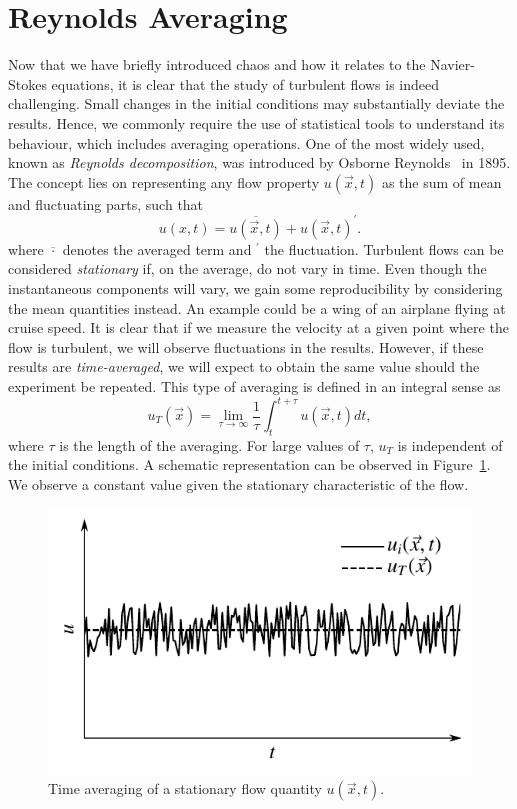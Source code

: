 \section{Reynolds Averaging}
Now that we have briefly introduced chaos and how it relates to the Navier-Stokes equations, it is clear that the study of turbulent flows is indeed challenging. Small changes in the initial conditions may substantially deviate the results. Hence, we commonly require the use of statistical tools to understand its behaviour, which includes averaging operations. One of the most widely used, known as \textit{Reynolds decomposition}, was introduced by Osborne Reynolds~\cite{} in 1895. The concept lies on representing any flow property $u(\vec{x},t)$ as the sum of mean and fluctuating parts, such that
\begin{equation}
	u(x,t) = \overline{u(\vec{x},t)} + u(\vec{x},t)^\prime.
	\label{eq:reynolds_decomp}
\end{equation}
where $\overline{\cdot}$ denotes the averaged term and $^\prime$ the fluctuation.
Turbulent flows can be considered \textit{stationary} if, on the average, do not vary in time. Even though the instantaneous components will vary, we gain some reproducibility by considering the mean quantities instead. An example could be a wing of an airplane flying at cruise speed. It is clear that if we measure the velocity at a given point where the flow is turbulent, we will observe fluctuations in the results. However, if these results are \textit{time-averaged}, we will expect to obtain the same value should the experiment be repeated. This type of averaging is defined in an integral sense as
\begin{equation}
	u_T(\vec{x}) = \lim_{\tau\rightarrow\infty} \frac{1}{\tau} \int_t^{t+\tau} u(\vec{x},t)dt,
	\label{eq:time_averaging}
\end{equation}
where $\tau$ is the length of the averaging. For large values of $\tau$, $u_T$ is independent of the initial conditions. A schematic representation can be observed in Figure~\ref{fig:time_averaging}. We observe a constant value given the stationary characteristic of the flow.
\begin{figure}[htbp]
	\centering
	\includegraphics[width=0.7\linewidth]{Pictures/ch7_time_averaging}
	\caption{Time averaging of a stationary flow quantity $u(\vec{x},t).$}
	\label{fig:time_averaging}
\end{figure}
